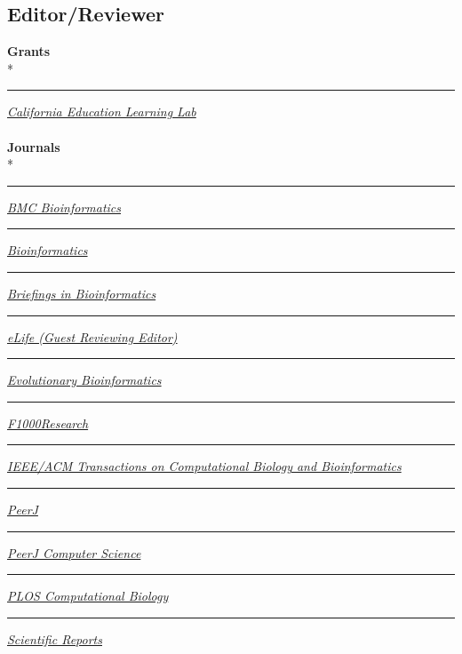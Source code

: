 \documentclass[margin,line]{res}
\begin{document}
\begin{resume}
\section{\sc Editor/Reviewer}
\textbf{Grants}\\*
\rule{-1mm}{5mm} \hspace*{4mm} \href{http://opr.ca.gov/learninglab/}{\textit{California Education Learning Lab}}\\
~\\
\textbf{Journals}\\*
\rule{-1mm}{5mm} \hspace*{4mm} \href{https://bmcbioinformatics.biomedcentral.com/}{\textit{BMC Bioinformatics}}\\
\rule{-1mm}{5mm} \hspace*{4mm} \href{https://academic.oup.com/bioinformatics}{\textit{Bioinformatics}}\\
\rule{-1mm}{5mm} \hspace*{4mm} \href{https://academic.oup.com/bib}{\textit{Briefings in Bioinformatics}}\\
\rule{-1mm}{5mm} \hspace*{4mm} \href{https://elifesciences.org/}{\textit{eLife (Guest Reviewing Editor)}}\\
\rule{-1mm}{5mm} \hspace*{4mm} \href{https://journals.sagepub.com/home/evb}{\textit{Evolutionary Bioinformatics}}\\
\rule{-1mm}{5mm} \hspace*{4mm} \href{https://f1000research.com}{\textit{F1000Research}}\\
\rule{-1mm}{6mm} \hspace*{4mm} \href{https://ieeexplore.ieee.org/xpl/aboutJournal.jsp?punumber=8857}{\textit{IEEE/ACM Transactions on Computational Biology and Bioinformatics
}}\\
\rule{-1mm}{5mm} \hspace*{4mm} \href{https://peerj.com/}{\textit{PeerJ}}\\
\rule{-1mm}{5mm} \hspace*{4mm} \href{https://peerj.com/computer-science/}{\textit{PeerJ Computer Science}}\\
\rule{-1mm}{5mm} \hspace*{4mm} \href{https://journals.plos.org/ploscompbiol/}{\textit{PLOS Computational Biology}}\\
\rule{-1mm}{5mm} \hspace*{4mm} \href{https://www.nature.com/srep/}{\textit{Scientific Reports}}\\

\end{resume}
\end{document}
